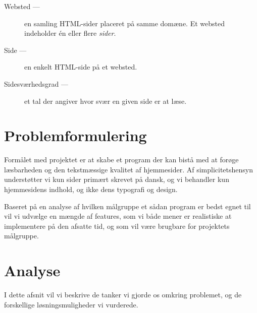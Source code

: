 \documentclass[a4paper,oneside]{memoir}
\begin{document}
\begin{description}
\item[Websted ---] en samling HTML-sider placeret på samme domæne. Et
  websted indeholder én eller flere \textit{sider}.
\item[Side ---] en enkelt HTML-side på et websted.
\item[Sidesværhedsgrad ---] et tal der angiver hvor svær en given side er
  at læse.
\end{description}

\chapter{Problemformulering}
\label{problemformulering}
Formålet med projektet er at skabe et program der kan bistå med at
forøge læsbarheden og den tekstmæssige kvalitet af hjemmesider. Af
simplicitetshensyn understøtter vi kun sider primært skrevet på dansk,
og vi behandler kun hjemmesidens indhold, og ikke dens typografi og
design.

Baseret på en analyse af hvilken målgruppe et sådan program er bedst
egnet til vil vi udvælge en mængde af features, som vi både mener er
realistiske at implementere på den afsatte tid, og som vil være
brugbare for projektets målgruppe.

\chapter{Analyse}
\label{analyse}
I dette afsnit vil vi beskrive de tanker vi gjorde os omkring
problemet, og de forskellige løsningsmuligheder vi vurderede.
\end{document}
